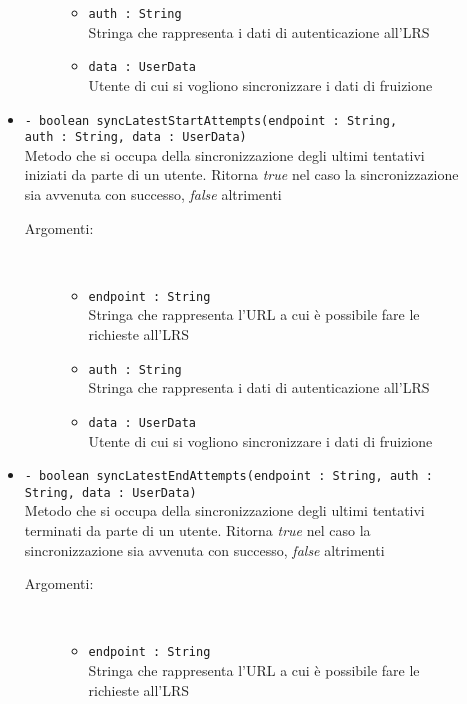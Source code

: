 \documentclass[../Tesi.tex]{subfiles}
\begin{document}
\begin{description}
\begin{itemize}
\begin{description}
\begin{itemize}
						\item \texttt{auth : String}\\
						Stringa che rappresenta i dati di autenticazione all'LRS

						\item \texttt{data : UserData}\\
						Utente di cui si vogliono sincronizzare i dati di fruizione
					\end{itemize}
				\end{description}

				\item \texttt{- boolean syncLatestStartAttempts(endpoint : String, \\auth : String, data : UserData)}\\
				Metodo che si occupa della sincronizzazione degli ultimi tentativi iniziati da parte di un utente. Ritorna \textit{true} nel caso la sincronizzazione sia avvenuta con successo, \textit{false} altrimenti
				\begin{description}
					\item[Argomenti:] \
					\begin{itemize}
						\item \texttt{endpoint : String}\\
						Stringa che rappresenta l'URL a cui è possibile fare le richieste all'LRS

						\item \texttt{auth : String}\\
						Stringa che rappresenta i dati di autenticazione all'LRS

						\item \texttt{data : UserData}\\
						Utente di cui si vogliono sincronizzare i dati di fruizione
					\end{itemize}
				\end{description}

				\item \texttt{- boolean syncLatestEndAttempts(endpoint : String, auth : String, data : UserData)}\\
				Metodo che si occupa della sincronizzazione degli ultimi tentativi terminati da parte di un utente. Ritorna \textit{true} nel caso la sincronizzazione sia avvenuta con successo, \textit{false} altrimenti
				\begin{description}
					\item[Argomenti:] \
					\begin{itemize}
						\item \texttt{endpoint : String}\\
						Stringa che rappresenta l'URL a cui è possibile fare le richieste all'LRS


\end{itemize}
\end{description}
\end{itemize}
\end{description}
\end{document}
